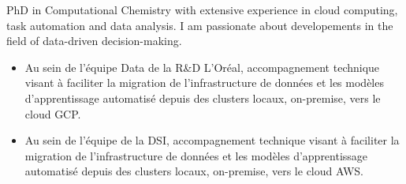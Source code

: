 \documentclass[10pt,a4paper,ragged2e,academicons]{altacv}
\begin{document}

\begin{fullwidth}
\makecvheader
\parbox{.7\paperwidth}{%
PhD in Computational Chemistry with extensive experience in cloud computing, task automation and data analysis. I am passionate about developements in the field of data-driven decision-making.
}

\end{fullwidth}



\begin{itemize}
\item Au sein de l’équipe Data de la R\&D L’Oréal, accompagnement technique visant à faciliter la migration de l’infrastructure de données et les modèles d’apprentissage automatisé depuis des clusters locaux, on-premise, vers le cloud GCP.
\end{itemize}

\divider

\begin{itemize}
\item Au sein de l’équipe de la DSI, accompagnement technique visant à faciliter la migration
de l’infrastructure de données et les modèles d’apprentissage automatisé depuis des
clusters locaux, on-premise, vers le cloud AWS. 
\end{itemize}
\end{document}
